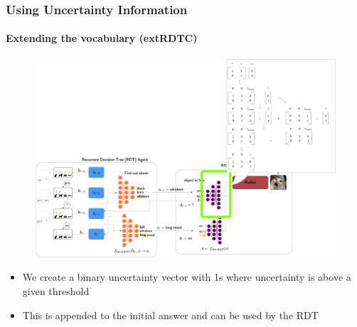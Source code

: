 \documentclass[9pt]{beamer}
\begin{document}
\begin{frame}
\frametitle{Using Uncertainty Information}
\framesubtitle{Extending the vocabulary (extRDTC)}
\begin{figure}
	\includegraphics[width=0.8\linewidth]{images/extRDTC_intution.pdf}
\end{figure}
\begin{itemize}
	\item We create a binary uncertainty vector with 1s where uncertainty is above a given threshold
	\item This is appended to the initial answer and can be used by the RDT
\end{itemize}
\end{frame}



\end{document}
